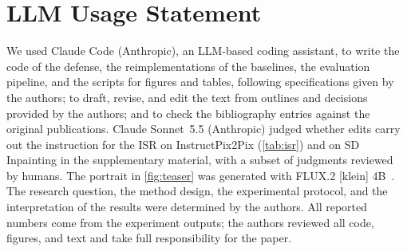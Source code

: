 \section*{LLM Usage Statement}
We used Claude Code (Anthropic), an LLM-based coding assistant, to write the code of the defense, the reimplementations of the baselines, the evaluation pipeline, and the scripts for figures and tables, following specifications given by the authors; to draft, revise, and edit the text from outlines and decisions provided by the authors; and to check the bibliography entries against the original publications. Claude Sonnet~5.5 (Anthropic) judged whether edits carry out the instruction for the ISR on InstructPix2Pix (\cref{tab:isr}) and on SD Inpainting in the supplementary material, with a subset of judgments reviewed by humans. The portrait in \cref{fig:teaser} was generated with FLUX.2 [klein] 4B~\cite{bfl2026flux2klein}. The research question, the method design, the experimental protocol, and the interpretation of the results were determined by the authors. All reported numbers come from the experiment outputs; the authors reviewed all code, figures, and text and take full responsibility for the paper.
